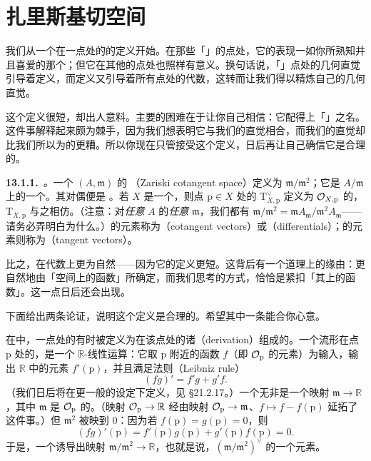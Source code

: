 
\section{扎里斯基切空间}

我们从一个\trScheme{}在一点处的\trTangentSpace{}的定义开始。在那些「\trSmooth」的点处，它的表现一如你所熟知并且喜爱的那个\trTangentSpace；但它在其他的点处也照样有意义。换句话说，「\trSmooth」点处的几何直觉引导着定义，而定义又引导着所有点处的代数，这转而让我们得以精炼自己的几何直觉。

这个定义很短，却出人意料。主要的困难在于让你自己相信：它配得上「\trTangentSpace」之名。这件事解释起来颇为棘手，因为我们想表明它与我们的直觉相合，而我们的直觉却比我们所以为的更糟。所以你现在只管接受这个定义，日后再让自己确信它是合理的。

\textbf{13.1.1.}\ \emph{\trhDefinition{}。}\quad 一个\trLocalRing{} $(A,\mathfrak{m})$ 的 \textbf{\trZariski{}\trCotangentSpace}（Zariski cotangent space）定义为 $\mathfrak{m}/\mathfrak{m}^2$；它是\trResidueField{} $A/\mathfrak{m}$ 上的一个\trVectorSpace。其对偶\trVectorSpace{}便是 \textbf{\trZariski{}\trTangentSpace}。若 $X$ 是一个\trScheme，则点 $\mathrm{p}\in X$ 处的 \textbf{\trZariski{}\trCotangentSpace} $\mathrm{T}^{\vee}_{X,\mathrm{p}}$ 定义为\trLocalRing{} $\mathcal{O}_{X,\mathrm{p}}$ 的\trZariski{}\trCotangentSpace，\textbf{\trZariski{}\trTangentSpace} $\mathrm{T}_{X,\mathrm{p}}$ 与之相仿。（注意：对\emph{任意}\trRing{} $A$ 的\emph{任意}\trMaximalIdeal{} $\mathfrak{m}$，我们都\trCanonically{}有 $\mathfrak{m}/\mathfrak{m}^2=\mathfrak{m}A_{\mathfrak{m}}/\mathfrak{m}^2A_{\mathfrak{m}}$——请务必弄明白为什么。）\trZariski{}\trCotangentSpace{}的元素称为\textbf{\trCotangentVector}（cotangent vectors）或\textbf{\trDifferential}（differentials）；\trTangentSpace{}的元素则称为\textbf{\trTangentVector}（tangent vectors）。

比之\trTangentSpace，\trCotangentSpace{}在代数上更为自然——因为它的定义更短。这背后有一个道理上的缘由：\trCotangentSpace{}更自然地由「空间上的函数」所确定，而我们思考\trScheme{}的方式，恰恰是紧扣「其上的函数」。这一点日后还会出现。

下面给出两条论证，说明这个定义是合理的。希望其中一条能合你心意。

在\trDifferentialGeometry{}中，一点处的\trTangentSpace{}有时被定义为在该点处的诸\trDerivation（derivation）组成的\trVectorSpace。一个流形在点 $\mathrm{p}$ 处的\trDerivation，是一个 $\mathbb{R}$-线性运算：它取 $\mathrm{p}$ 附近的函数 $f$（即 $\mathcal{O}_{\mathrm{p}}$ 的元素）为输入，输出 $\mathbb{R}$ 中的元素 $f'(\mathrm{p})$，并且满足\trLeibniz{}法则（Leibniz rule）
\[
(fg)'=f'g+g'f.
\]
（我们日后将在更一般的设定下定义\trDerivation，见 \S21.2.17。）一个\trDerivation{}无非是一个映射 $\mathfrak{m}\to\mathbb{R}$，其中 $\mathfrak{m}$ 是 $\mathcal{O}_{\mathrm{p}}$ 的\trMaximalIdeal。（映射 $\mathcal{O}_{\mathrm{p}}\to\mathbb{R}$ 经由映射 $\mathcal{O}_{\mathrm{p}}\to\mathfrak{m}$、$f\mapsto f-f(\mathrm{p})$ 延拓了这件事。）但 $\mathfrak{m}^2$ 被映到 $0$：因为若 $f(\mathrm{p})=g(\mathrm{p})=0$，则
\[
(fg)'(\mathrm{p})=f'(\mathrm{p})g(\mathrm{p})+g'(\mathrm{p})f(\mathrm{p})=0.
\]
于是，一个\trDerivation{}诱导出映射 $\mathfrak{m}/\mathfrak{m}^2\to\mathbb{R}$，也就是说，$(\mathfrak{m}/\mathfrak{m}^2)^{\vee}$ 的一个元素。

